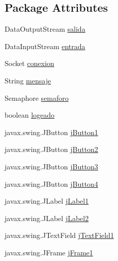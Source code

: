 \subsection*{Package Attributes}
\begin{DoxyCompactItemize}
\item 
Data\+Output\+Stream \mbox{\hyperlink{classpecl6part2_1_1_cliente_controlador_a05461ea286f84b5f3f8b82641a5d23af}{salida}}
\item 
Data\+Input\+Stream \mbox{\hyperlink{classpecl6part2_1_1_cliente_controlador_aaafa871f0ee5e5d481b9ffb65b9a2a8a}{entrada}}
\item 
Socket \mbox{\hyperlink{classpecl6part2_1_1_cliente_controlador_a4882463501ccc3555c15225ea3076745}{conexion}}
\item 
String \mbox{\hyperlink{classpecl6part2_1_1_cliente_controlador_ac5b6761cd1ff976535207035f94a6396}{mensaje}}
\item 
Semaphore \mbox{\hyperlink{classpecl6part2_1_1_cliente_controlador_a200ce4defcaa86a68e9c8234f9e48a81}{semaforo}}
\item 
boolean \mbox{\hyperlink{classpecl6part2_1_1_cliente_controlador_a3af6d2071d85755b557cf2a98fca51d5}{logeado}}
\item 
javax.\+swing.\+J\+Button \mbox{\hyperlink{classpecl6part2_1_1_cliente_controlador_a5571779a9b4a52006f160ba893b7c62d}{j\+Button1}}
\item 
javax.\+swing.\+J\+Button \mbox{\hyperlink{classpecl6part2_1_1_cliente_controlador_a0de10db6dfe46c00048ea574708f4898}{j\+Button2}}
\item 
javax.\+swing.\+J\+Button \mbox{\hyperlink{classpecl6part2_1_1_cliente_controlador_a6ed6a9f1bcab81559b649c08fd2a59b8}{j\+Button3}}
\item 
javax.\+swing.\+J\+Button \mbox{\hyperlink{classpecl6part2_1_1_cliente_controlador_a4d53fe3682184dc12af7fb5edaa74f3a}{j\+Button4}}
\item 
javax.\+swing.\+J\+Label \mbox{\hyperlink{classpecl6part2_1_1_cliente_controlador_a9bc2f24760cd5b88584b4275aa3845db}{j\+Label1}}
\item 
javax.\+swing.\+J\+Label \mbox{\hyperlink{classpecl6part2_1_1_cliente_controlador_ad3f5a84dad8ebb14caedb619cec82f7b}{j\+Label2}}
\item 
javax.\+swing.\+J\+Text\+Field \mbox{\hyperlink{classpecl6part2_1_1_cliente_controlador_a04f4a0311eac4cee8bca8c1617f2f249}{j\+Text\+Field1}}
\item 
javax.\+swing.\+J\+Frame \mbox{\hyperlink{classpecl6part2_1_1_cliente_controlador_a8f6efcec989c5ef5daccf7a9009ffbb2}{j\+Frame1}}
\end{DoxyCompactItemize}


